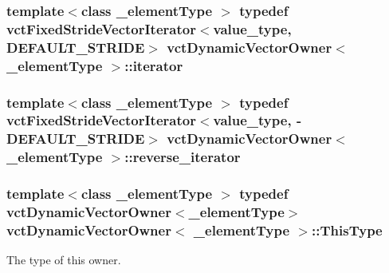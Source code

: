 \subsubsection[{iterator}]{\setlength{\rightskip}{0pt plus 5cm}template$<$class \+\_\+element\+Type $>$ typedef {\bf vct\+Fixed\+Stride\+Vector\+Iterator}$<$value\+\_\+type, {\bf D\+E\+F\+A\+U\+L\+T\+\_\+\+S\+T\+R\+I\+D\+E}$>$ {\bf vct\+Dynamic\+Vector\+Owner}$<$ \+\_\+element\+Type $>$\+::{\bf iterator}}\label{classvct_dynamic_vector_owner_a0ef55f887d1340204d64f21d4db08fad}
\hypertarget{classvct_dynamic_vector_owner_a963d655b94fe07a9c7abbee2705005d1}{}
\subsubsection[{reverse\+\_\+iterator}]{\setlength{\rightskip}{0pt plus 5cm}template$<$class \+\_\+element\+Type $>$ typedef {\bf vct\+Fixed\+Stride\+Vector\+Iterator}$<$value\+\_\+type, -\/{\bf D\+E\+F\+A\+U\+L\+T\+\_\+\+S\+T\+R\+I\+D\+E}$>$ {\bf vct\+Dynamic\+Vector\+Owner}$<$ \+\_\+element\+Type $>$\+::{\bf reverse\+\_\+iterator}}\label{classvct_dynamic_vector_owner_a963d655b94fe07a9c7abbee2705005d1}
\hypertarget{classvct_dynamic_vector_owner_ad27e45098d2fe34a4650fca580526b18}{}
\subsubsection[{This\+Type}]{\setlength{\rightskip}{0pt plus 5cm}template$<$class \+\_\+element\+Type $>$ typedef {\bf vct\+Dynamic\+Vector\+Owner}$<$\+\_\+element\+Type$>$ {\bf vct\+Dynamic\+Vector\+Owner}$<$ \+\_\+element\+Type $>$\+::{\bf This\+Type}}\label{classvct_dynamic_vector_owner_ad27e45098d2fe34a4650fca580526b18}
The type of this owner. 

